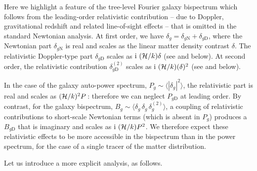 Here we highlight a feature of the tree-level Fourier galaxy bispectrum which follows from the  leading-order relativistic contribution -- due to Doppler, gravitational redshift  and related line-of-sight effects -- that is omitted in the standard Newtonian analysis. 
At first order, we have $\delta_g=\delta_{g\mathrm{N}}+ \delta_{g\mathrm{D}}$, where the Newtonian part $\delta_{g\mathrm{N}}$ is real and scales as the linear matter density contrast $\delta$. The 
relativistic Doppler-type part $\delta_{g\mathrm{D}}$ scales as ${\mathrm{i\,}}\,(\mathcal{H}/k) \delta$  (see \cite{McDonald:2009dh, Jeong:2011as, Abramo:2017xnp,Clarkson:2018dwn} and below). At second  order, the relativistic contribution $\delta_{g\mathrm{D}}^{(2)}$ scales as ${\mathrm{i\,}}\,(\mathcal{H}/k) (\delta)^2$ (see \cite{Clarkson:2018dwn} and below). 


In the case of  the galaxy {auto}-power spectrum, $P_g\sim \langle |\delta_g|^2\rangle$, the relativistic part is {real and scales as} $(\mathcal{H}/k)^2P$\,:  therefore we can neglect $P_{g\mathrm{D}}$ at leading order. By contrast, for the galaxy bispectrum, $B_g\sim \langle \delta_g\,\delta_g \, \delta^{(2)}_g\rangle$, a coupling of relativistic contributions to short-scale Newtonian terms (which  is absent in $P_g$) produces a $B_{g\mathrm{D}}$ that is {imaginary and scales as} ${\mathrm{i\,}}\,(\mathcal{H}/k)P^2$. 
We therefore expect these relativistic effects to be more accessible in the bispectrum than in the power spectrum, for the case of a single tracer {of the matter distribution}. 


Let us introduce a more explicit analysis, as follows.

